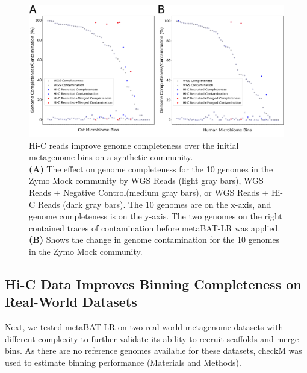 \documentclass[fleqn,10pt,lineno]{wlpeerj}
\providecommand{\DIFaddbeginFL}{} %
\providecommand{\DIFaddendFL}{} %
\providecommand{\DIFdelbeginFL}{} %
\providecommand{\DIFdelendFL}{} %
\newcommand{\DIFscaledelfig}{0.5}
\newlength{\DIFdelgraphicswidth} %
\newlength{\DIFdelgraphicsheight} %
\newcommand{\DIFaddincludegraphics}[2][]{{\color{blue}\fbox{\DIFOincludegraphics[#1]{#2}}}} %
\newcommand{\DIFdelincludegraphics}[2][]{%
\sbox{\DIFdelgraphicsbox}{\DIFOincludegraphics[#1]{#2}}%
\settoboxwidth{\DIFdelgraphicswidth}{\DIFdelgraphicsbox} %
\settoboxtotalheight{\DIFdelgraphicsheight}{\DIFdelgraphicsbox} %
\scalebox{\DIFscaledelfig}{%
\parbox[b]{\DIFdelgraphicswidth}{\usebox{\DIFdelgraphicsbox}\\[-\baselineskip] \rule{\DIFdelgraphicswidth}{0em}}\llap{\resizebox{\DIFdelgraphicswidth}{\DIFdelgraphicsheight}{%
\setlength{\unitlength}{\DIFdelgraphicswidth}%
\begin{picture}(1,1)%
\thicklines\linethickness{2pt} %
{\color[rgb]{1,0,0}\put(0,0){\framebox(1,1){}}}%
{\color[rgb]{1,0,0}\put(0,0){\line( 1,1){1}}}%
{\color[rgb]{1,0,0}\put(0,1){\line(1,-1){1}}}%
\end{picture}%
}\hspace*{3pt}}} %
} %
\DeclareRobustCommand{\DIFaddbeginFL}{\DIFOaddbeginFL \let\includegraphics\DIFaddincludegraphics} %
\DeclareRobustCommand{\DIFaddendFL}{\DIFOaddendFL \let\includegraphics\DIFOincludegraphics} %
\DeclareRobustCommand{\DIFdelbeginFL}{\DIFOdelbeginFL \let\includegraphics\DIFdelincludegraphics} %
\DeclareRobustCommand{\DIFdelendFL}{\DIFOaddendFL \let\includegraphics\DIFOincludegraphics} %
\begin{document}
  
\begin{figure}[ht!]
\centering
\DIFdelbeginFL %
\DIFdelendFL \DIFaddbeginFL \includegraphics[scale=0.7]{Fig3.pdf}
\DIFaddendFL \caption{Hi-C reads improve genome completeness over the initial metagenome bins on a synthetic community.
    \\\textbf{(A)} The effect on genome completeness for the 10 genomes in the Zymo Mock community by WGS Reads (light gray bars), WGS Reads + Negative Control(medium gray bars), or WGS Reads + Hi-C Reads (dark gray bars). The 10 genomes are on the x-axis, and genome completeness is on the y-axis. The two genomes on the right contained traces of contamination before metaBAT-LR was applied. \textbf{(B)} Shows the change in genome contamination for the 10 genomes in the Zymo Mock community.}
\label{fig:synthetic}
\end{figure}


\subsection*{Hi-C Data Improves Binning Completeness on Real-World Datasets}

Next, we tested metaBAT-LR on two real-world metagenome datasets with different complexity to further validate its ability to recruit scaffolds and merge bins. As there are no reference genomes available for these datasets, checkM was used to estimate binning performance (Materials and Methods). 
\end{document}
